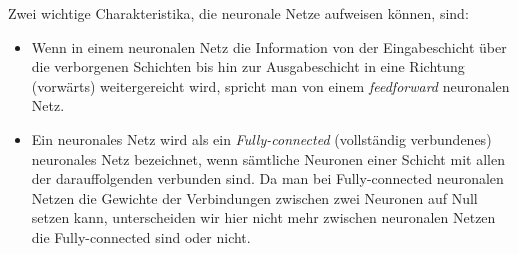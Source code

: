 %        
%        
%        
%        
%        
%    
%    
Zwei wichtige Charakteristika, die neuronale Netze aufweisen können, sind:
\begin{itemize}
\item Wenn in einem neuronalen Netz die Information von der Eingabeschicht über die verborgenen Schichten bis hin zur Ausgabeschicht in eine Richtung (\glqq vorwärts\grqq) weitergereicht wird, spricht man von einem \textit{feedforward} neuronalen Netz.
\item Ein neuronales Netz wird als ein \textit{Fully-connected} (\glqq vollständig verbundenes\grqq\@) neuronales Netz bezeichnet, wenn sämtliche Neuronen einer Schicht mit allen der darauffolgenden verbunden sind. Da man bei Fully-connected neuronalen Netzen die Gewichte der Verbindungen zwischen zwei Neuronen auf Null setzen kann, unterscheiden wir hier nicht mehr zwischen neuronalen Netzen die Fully-connected sind oder nicht.
\end{itemize}
